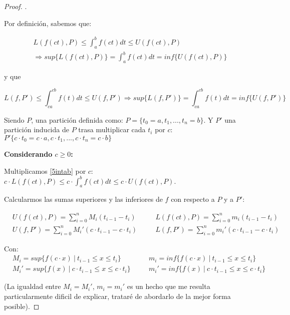 \documentclass[12pt]{article}
\begin{document}
\begin{proof}
    . \medskip

    Por definici\'on, sabemos que:

    \begin{multline}
        \label{5intab}
        L(f(ct),P)\leq\int_{a}^{b}f(ct)dt\leq U(f(ct),P) \\ \Longrightarrow sup\{L(f(ct),P)\}=\int_{a}^{b}f(ct)dt=inf\{U(f(ct),P)\}
    \end{multline}

    y que

    \begin{equation}
        \label{5intcacb}
        L(f,P')\leq\int_{ca}^{cb}f(t)dt\leq U(f,P') \Longrightarrow sup\{L(f,P')\}=\int_{ca}^{cb}f(t)dt=inf\{U(f,P')\}
    \end{equation}

    Siendo $P$, una partici\'on definida como: \(P=\{t_0=a,t_1,...,t_n=b\}\). Y $P'$ una partici\'on inducida de $P$ trasa multiplicar cada $t_i$ por $c$: \(P'\{c\cdot t_0=c\cdot a,c\cdot t_1,...,c\cdot t_n=c\cdot b\}\)\bigskip

    \textbf{Considerando $c\geq0$:}\bigskip

    Multiplicamos \eqref{5intab} por $c$: \quad \(c\cdot L(f(ct),P)\leq c\cdot\int_{a}^{b}f(ct)dt\leq c\cdot U(f(ct),P)\).\bigskip

    Calcularmos las sumas superiores y las inferiores de $f$ con respecto a $P$ y a $P'$:

    \begin{align*}
        &U(f(ct),P)=\sum_{i=0}^n M_i(t_{i-1}-t_i) \quad &&L(f(ct),P)=\sum_{i=0}^n m_i(t_{i-1}-t_i)\\
        &U(f,P')=\sum_{i=0}^n M_i'(c\cdot t_{i-1}-c\cdot t_i) \quad &&L(f,P')=\sum_{i=0}^n m_i'(c\cdot t_{i-1}-c\cdot t_i)
    \end{align*}

    Con:
    \begin{align*}
        &M_i=sup\{f(c\cdot x) \ | \ t_{i-1}\leq x\leq t_i\} \quad &&m_i=inf\{f(c\cdot x) \ | \ t_{i-1}\leq x\leq t_i\}\\
        &M_i'=sup\{f(x) \ | \ c\cdot t_{i-1}\leq x\leq c\cdot t_i\} \quad &&m_i'=inf\{f(x) \ | \ c\cdot t_{i-1}\leq x\leq c\cdot t_i\}
    \end{align*}

    (La igualdad entre $M_i=M_i'$, $m_i=m_i'$ es un hecho que me resulta particularmente dificil de explicar, tratar\'e de abordarlo de la mejor forma posible).\bigskip


\end{proof}
\end{document}
